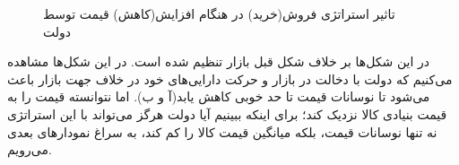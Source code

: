 \documentclass[13pt,onecolumn,a4paper]{article}
\begin{document}
		\begin{figure}[H]
		\centering
		\hfil
		
		\medskip
		\hfil
		
		\caption{تاثیر استراتژی فروش(خرید) در هنگام افزایش(کاهش) قیمت توسط دولت }
		\label{fig:myfigure}
	\end{figure}
در این شکل‌ها بر خلاف شکل قبل بازار تنظیم شده است. در این شکل‌ها مشاهده می‌کنیم که دولت با دخالت در بازار و حرکت دارایی‌های خود در خلاف جهت بازار باعث می‌شود تا نوسانات قیمت تا حد خوبی کاهش یابد(آ و ب). اما نتوانسته قیمت را به قیمت بنیادی کالا نزدیک کند؛ برای اینکه ببینیم آیا دولت هرگز می‌تواند با این استراتژی نه تنها نوسانات قیمت، بلکه میانگین قیمت کالا را کم کند، به سراغ نمودارهای بعدی می‌رویم.
\end{document}
